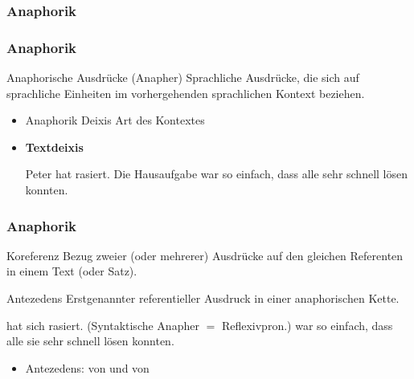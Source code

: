 %
\subsubsection{Anaphorik}
%

\begin{frame}
\frametitle{Anaphorik}

\begin{block}{Anaphorische Ausdrücke (Anapher)}
	Sprachliche Ausdrücke, die sich auf sprachliche Einheiten im vorhergehenden sprachlichen Kontext beziehen.
\end{block}

\begin{itemize}
	\item Anaphorik \vs Deixis \ras Art des Kontextes
	\medskip
	\item \textbf{Textdeixis}
	
	\eal 
	\ex Peter hat  rasiert.
	\ex Die Hausaufgabe war so einfach, dass alle  sehr schnell lösen konnten.
	\zl
	
\end{itemize}
	
\end{frame}



\begin{frame}
\frametitle{Anaphorik}

\begin{block}{Koreferenz}
	Bezug zweier (oder mehrerer) Ausdrücke auf den gleichen Referenten in einem Text (oder Satz).
\end{block}

\begin{block}{Antezedens}
	Erstgenannter referentieller Ausdruck in einer anaphorischen Kette.
\end{block}


	
		\eal 
		\ex {} hat sich rasiert. (Syntaktische Anapher $=$ Reflexivpron.)
		\ex {} war so einfach, dass alle sie sehr schnell lösen konnten.
		\zl
		
		\begin{itemize}
			\item Antezedens:  von  und  von 
		\end{itemize}
	


\end{frame}


